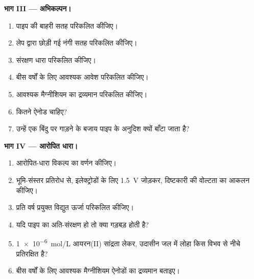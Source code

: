 \begin{problem}
\medskip
\noindent\textbf{भाग III --- अभिकल्पन।}
\begin{enumerate}[resume]
  \item पाइप की बाहरी सतह परिकलित कीजिए।
  \item लेप द्वारा छोड़ी गई नंगी सतह परिकलित कीजिए।
  \item संरक्षण धारा परिकलित कीजिए।
  \item बीस वर्षों के लिए आवश्यक आवेश परिकलित कीजिए।
  \item आवश्यक मैग्नीशियम का द्रव्यमान परिकलित कीजिए।
  \item कितने ऐनोड चाहिए?
  \item उन्हें एक बिंदु पर गाड़ने के बजाय पाइप के अनुदिश क्यों बाँटा जाता
        है?
\end{enumerate}

\medskip
\noindent\textbf{भाग IV --- आरोपित धारा।}
\begin{enumerate}[resume]
  \item आरोपित-धारा विकल्प का वर्णन कीजिए।
  \item भूमि-संस्तर प्रतिरोध से, इलेक्ट्रोडों के लिए \qty{1.5}{V} जोड़कर,
        दिष्टकारी की वोल्टता का आकलन कीजिए।
  \item प्रति वर्ष प्रयुक्त विद्युत ऊर्जा परिकलित कीजिए।
  \item यदि पाइप का अति-संरक्षण हो तो क्या गड़बड़ होती है?
  \item \qty{1e-6}{mol/L} आयरन(II) सांद्रता लेकर, उदासीन जल में लोहा
        किस विभव से नीचे प्रतिरक्षित है?
  \item बीस वर्षों के लिए आवश्यक मैग्नीशियम ऐनोडों का द्रव्यमान बताइए।
\end{enumerate}
\end{problem}
